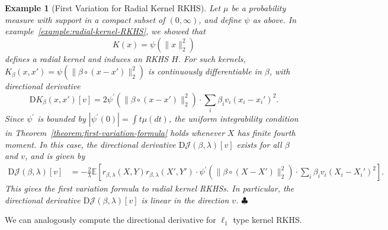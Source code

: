 \documentclass[sn-mathphys-num]{sn-jnl}%
\numberwithin{equation}{section}
\newcommand{\E}{\mathbb{E}}
\newcommand{\kernel}{K}
\newcommand{\profile}{\psi}
\theoremstyle{thmstyleone}%
\theoremstyle{thmstyletwo}%
\newtheorem{example}{Example}%
\theoremstyle{thmstylethree}%
\begin{document}
\vspace{.5em} 
\begin{example}[First Variation for Radial Kernel RKHS]
\emph{
 Let $\mu$ be a probability measure with support in a compact subset of $(0, \infty)$, and define 
$\profile$ as above. In example~\ref{example:radial-kernel-RKHS}, we showed that 
\begin{equation*}
	\kernel(x) = \profile(\|x\|_2^2) 
\end{equation*}
defines a radial kernel and induces an RKHS $H$. %
For such kernels, $\kernel_\beta(x, x') = \profile(\|\beta \circ (x - x')\|_2^2)$ is continuously differentiable in $\beta$, with directional derivative
\begin{equation*}
	\mathrm{D} \kernel_\beta(x, x')[v] = 2 \profile^\prime(\|\beta \circ (x - x')\|_2^2) \cdot \sum_i \beta_i v_i (x_i - x_i')^2.
\end{equation*}
Since $\profile^\prime$ is bounded by $|\profile^\prime(0)| = \int t \mu(dt)$, the uniform integrability condition in Theorem~\ref{theorem:first-variation-formula} holds whenever $X$ has finite fourth moment. In this case, the directional derivative $\mathrm{D} \mathcal{J}(\beta, \lambda)[v]$ exists for all $\beta$ and $v$, and is given by
\begin{equation*}
\begin{split} 
	\mathrm{D} \mathcal{J}(\beta, \lambda)[v] %
	&= -\frac{2}{\lambda} 
		\E[r_{\beta, \lambda}(X, Y) r_{\beta, \lambda}(X', Y') \cdot \profile^\prime(\|\beta \circ (X - X')\|_2^2) \cdot \sum_i \beta_i v_i (X_i - X_i')^2].
\end{split} 
\end{equation*}
This gives the first variation formula to radial kernel RKHSs. In particular, the directional derivative $\mathrm{D} \mathcal{J}(\beta, \lambda)[v]$ is linear in the direction $v$. 
}  $\clubsuit$
\end{example}

\vspace{.5em} 

We can analogously compute the directional derivative for $\ell_1$ type kernel RKHS. 
\end{document}
